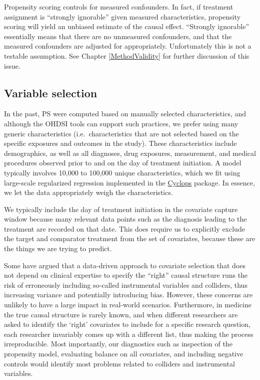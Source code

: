 \documentclass[11pt]{book}
\let\BeginKnitrBlock\begin \let\EndKnitrBlock\end
\begin{document}
Propensity scoring controls for measured confounders. In fact, if
treatment assignment is ``strongly ignorable'' given measured
characteristics, propensity scoring will yield an unbiased estimate of
the causal effect. ``Strongly ignorable'' essentially means that there
are no unmeasured confounders, and that the measured confounders are
adjusted for appropriately. Unfortunately this is not a testable
assumption. See Chapter \ref{MethodValidity} for further discussion of
this issue.

\subsection{Variable selection}\label{VariableSelection}

In the past, PS were computed based on manually selected
characteristics, and although the OHDSI tools can support such
practices, we prefer using many generic characteristics
(i.e.~characteristics that are not selected based on the specific
exposures and outcomes in the study). \citep{tian_2018} These
characteristics include demographics, as well as all diagnoses, drug
exposures, measurement, and medical procedures observed prior to and on
the day of treatment initiation. A model typically involves 10,000 to
100,000 unique characteristics, which we fit using large-scale
regularized regression \citep{suchard_2013} implemented in the
\href{https://ohdsi.github.io/Cyclops/}{Cyclops} package. In essence, we
let the data appropriately weigh the characteristics.

\BeginKnitrBlock{rmdimportant}
We typically include the day of treatment initiation in the covariate
capture window because many relevant data points such as the diagnosis
leading to the treatment are recorded on that date. This does require us
to explicitly exclude the target and comparator treatment from the set
of covariates, because these are the things we are trying to predict.
\EndKnitrBlock{rmdimportant}

Some have argued that a data-driven approach to covariate selection that
does not depend on clinical expertise to specify the ``right'' causal
structure runs the risk of erroneously including so-called instrumental
variables and colliders, thus increasing variance and potentially
introducing bias. \citep{hernan_2002} However, these concerns are
unlikely to have a large impact in real-world scenarios.
\citep{schneeweiss_2018} Furthermore, in medicine the true causal
structure is rarely known, and when different researchers are asked to
identify the `right' covariates to include for a specific research
question, each researcher invariably comes up with a different list,
thus making the process irreproducible. Most importantly, our
diagnostics such as inspection of the propensity model, evaluating
balance on all covariates, and including negative controls would
identify most problems related to colliders and instrumental variables.
\end{document}

